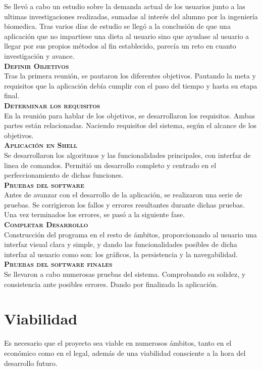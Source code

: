 Se llevó a cabo un estudio sobre la demanda actual de los usuarios junto a las ultimas investigaciones realizadas, sumadas al interés del alumno por la ingeniería biomedica. Tras varios días de estudio se llegó a la conclusión de que una aplicación que no impartiese una dieta al usuario sino que ayudase al usuario a llegar por sus propios métodos al fin establecido, parecía un reto en cuanto investigación y avance.\\

\textbf{\textsc{Definir Objetivos}}\\
Tras la primera reunión, se pautaron los diferentes objetivos. Pautando la meta y requisitos que la aplicación debía cumplir con el paso del tiempo y hasta su etapa final.\\

\textbf{\textsc{Determinar los requisitos}}\\
En la reunión para hablar de los objetivos, se desarrollaron los requisitos. Ambas partes están relacionadas. Naciendo requisitos del sistema, según el alcance de los objetivos.\\

\textbf{\textsc{Aplicación en Shell}}\\
Se desarrollaron los algoritmos y las funcionalidades principales, con interfaz de linea de comandos. Permitió un desarrollo completo y centrado en el perfeccionamiento de dichas funciones.\\

\textbf{\textsc{Pruebas del software}}\\
Antes de avanzar con el desarrollo de la aplicación, se realizaron una serie de pruebas. Se corrigieron los fallos y errores resultantes durante dichas pruebas. Una vez terminados los errores, se pasó a la siguiente fase.\\

\textbf{\textsc{Completar Desarrollo}}\\
Construcción del programa en el resto de ámbitos, proporcionando al usuario una interfaz visual clara y simple, y dando las funcionalidades posibles de dicha interfaz al usuario como son:  los gráficos, la persistencia y la navegabilidad.\\

\textbf{\textsc{Pruebas del software finales }}\\
Se llevaron a cabo numerosas pruebas del sistema. Comprobando su solidez, y consistencia ante posibles errores. Dando por finalizada la aplicación.
\section{Viabilidad}
Es necesario que el proyecto sea viable en numerosos ámbitos, tanto en el económico como en el legal, además de una viabilidad consciente a la hora del desarrollo futuro.
